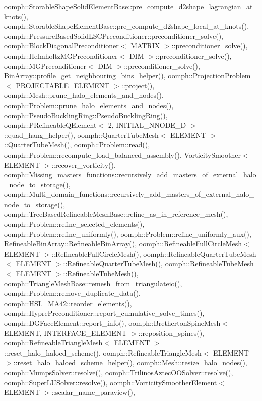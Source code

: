 oomph\+::\+Storable\+Shape\+Solid\+Element\+Base\+::pre\+\_\+compute\+\_\+d2shape\+\_\+lagrangian\+\_\+at\+\_\+knots(), oomph\+::\+Storable\+Shape\+Element\+Base\+::pre\+\_\+compute\+\_\+d2shape\+\_\+local\+\_\+at\+\_\+knots(), oomph\+::\+Pressure\+Based\+Solid\+L\+S\+C\+Preconditioner\+::preconditioner\+\_\+solve(), oomph\+::\+Block\+Diagonal\+Preconditioner$<$ M\+A\+T\+R\+I\+X $>$\+::preconditioner\+\_\+solve(), oomph\+::\+Helmholtz\+M\+G\+Preconditioner$<$ D\+I\+M $>$\+::preconditioner\+\_\+solve(), oomph\+::\+M\+G\+Preconditioner$<$ D\+I\+M $>$\+::preconditioner\+\_\+solve(), Bin\+Array\+::profile\+\_\+get\+\_\+neighbouring\+\_\+bins\+\_\+helper(), oomph\+::\+Projection\+Problem$<$ P\+R\+O\+J\+E\+C\+T\+A\+B\+L\+E\+\_\+\+E\+L\+E\+M\+E\+N\+T $>$\+::project(), oomph\+::\+Mesh\+::prune\+\_\+halo\+\_\+elements\+\_\+and\+\_\+nodes(), oomph\+::\+Problem\+::prune\+\_\+halo\+\_\+elements\+\_\+and\+\_\+nodes(), oomph\+::\+Pseudo\+Buckling\+Ring\+::\+Pseudo\+Buckling\+Ring(), oomph\+::\+P\+Refineable\+Q\+Element$<$ 2, I\+N\+I\+T\+I\+A\+L\+\_\+\+N\+N\+O\+D\+E\+\_\+D $>$\+::quad\+\_\+hang\+\_\+helper(), oomph\+::\+Quarter\+Tube\+Mesh$<$ E\+L\+E\+M\+E\+N\+T $>$\+::\+Quarter\+Tube\+Mesh(), oomph\+::\+Problem\+::read(), oomph\+::\+Problem\+::recompute\+\_\+load\+\_\+balanced\+\_\+assembly(), Vorticity\+Smoother$<$ E\+L\+E\+M\+E\+N\+T $>$\+::recover\+\_\+vorticity(), oomph\+::\+Missing\+\_\+masters\+\_\+functions\+::recursively\+\_\+add\+\_\+masters\+\_\+of\+\_\+external\+\_\+halo\+\_\+node\+\_\+to\+\_\+storage(), oomph\+::\+Multi\+\_\+domain\+\_\+functions\+::recursively\+\_\+add\+\_\+masters\+\_\+of\+\_\+external\+\_\+halo\+\_\+node\+\_\+to\+\_\+storage(), oomph\+::\+Tree\+Based\+Refineable\+Mesh\+Base\+::refine\+\_\+as\+\_\+in\+\_\+reference\+\_\+mesh(), oomph\+::\+Problem\+::refine\+\_\+selected\+\_\+elements(), oomph\+::\+Problem\+::refine\+\_\+uniformly(), oomph\+::\+Problem\+::refine\+\_\+uniformly\+\_\+aux(), Refineable\+Bin\+Array\+::\+Refineable\+Bin\+Array(), oomph\+::\+Refineable\+Full\+Circle\+Mesh$<$ E\+L\+E\+M\+E\+N\+T $>$\+::\+Refineable\+Full\+Circle\+Mesh(), oomph\+::\+Refineable\+Quarter\+Tube\+Mesh$<$ E\+L\+E\+M\+E\+N\+T $>$\+::\+Refineable\+Quarter\+Tube\+Mesh(), oomph\+::\+Refineable\+Tube\+Mesh$<$ E\+L\+E\+M\+E\+N\+T $>$\+::\+Refineable\+Tube\+Mesh(), oomph\+::\+Triangle\+Mesh\+Base\+::remesh\+\_\+from\+\_\+triangulateio(), oomph\+::\+Problem\+::remove\+\_\+duplicate\+\_\+data(), oomph\+::\+H\+S\+L\+\_\+\+M\+A42\+::reorder\+\_\+elements(), oomph\+::\+Hypre\+Preconditioner\+::report\+\_\+cumulative\+\_\+solve\+\_\+times(), oomph\+::\+D\+G\+Face\+Element\+::report\+\_\+info(), oomph\+::\+Bretherton\+Spine\+Mesh$<$ E\+L\+E\+M\+E\+N\+T, I\+N\+T\+E\+R\+F\+A\+C\+E\+\_\+\+E\+L\+E\+M\+E\+N\+T $>$\+::reposition\+\_\+spines(), oomph\+::\+Refineable\+Triangle\+Mesh$<$ E\+L\+E\+M\+E\+N\+T $>$\+::reset\+\_\+halo\+\_\+haloed\+\_\+scheme(), oomph\+::\+Refineable\+Triangle\+Mesh$<$ E\+L\+E\+M\+E\+N\+T $>$\+::reset\+\_\+halo\+\_\+haloed\+\_\+scheme\+\_\+helper(), oomph\+::\+Mesh\+::resize\+\_\+halo\+\_\+nodes(), oomph\+::\+Mumps\+Solver\+::resolve(), oomph\+::\+Trilinos\+Aztec\+O\+O\+Solver\+::resolve(), oomph\+::\+Super\+L\+U\+Solver\+::resolve(), oomph\+::\+Vorticity\+Smoother\+Element$<$ E\+L\+E\+M\+E\+N\+T $>$\+::scalar\+\_\+name\+\_\+paraview(), 